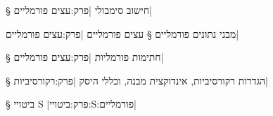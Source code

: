 \def\Title{חישוב סימבולי}


§ חישוב סימבולי 
|פרק:עצים פורמליים|



מבני נתונים פורמליים
§ עצים פורמליים 
|פרק:עצים פורמליים|


§ חתימות פורמליות 
|פרק:עצים פורמליים|

§ הגדרות רקורסיביות,  אינדוקצית מבנה, וכללי היסק
|פרק:רקורסיביות|


§ ביטויי S
|פרק:ביטויי:S:פורמליים|

